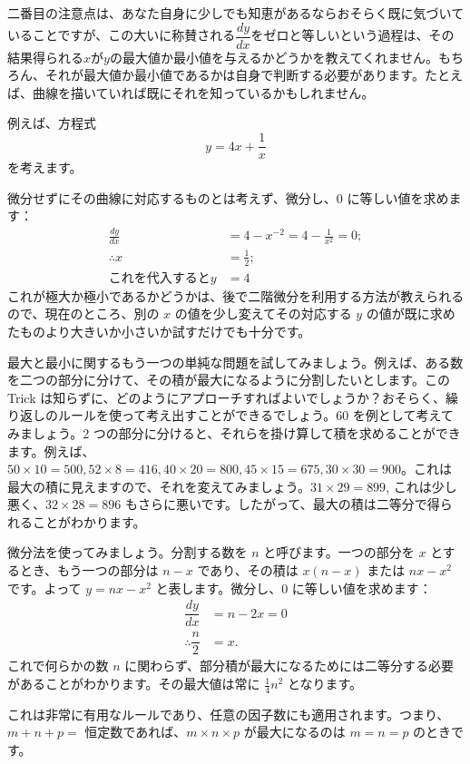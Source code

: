 \documentclass[a4paper,11pt,openany]{ltjsbook}
\begin{document}
二番目の注意点は、あなた自身に少しでも知恵があるならおそらく既に気づいていることですが、この大いに称賛される$\dfrac{dy}{dx}$をゼロと等しいという過程は、その結果得られる$x$が$y$の最大値か最小値を与えるかどうかを教えてくれません。もちろん、それが最大値か最小値であるかは自身で判断する必要があります。たとえば、曲線を描いていれば既にそれを知っているかもしれません。

例えば、方程式
\[
y = 4x + \frac{1}{x}
\]
を考えます。

微分せずにその曲線に対応するものとは考えず、微分し、0 に等しい値を求めます：
\begin{align*}
\frac{dy}{dx} &= 4 - x^{-2} = 4 - \frac{1}{x^2} = 0; \\
\therefore x &= \frac{1}{2}; \\
\text{これを代入すると} y &= 4
\end{align*}
これが極大か極小であるかどうかは、後で二階微分を利用する方法が教えられるので、現在のところ、別の $x$ の値を少し変えてその対応する $y$ の値が既に求めたものより大きいか小さいか試すだけでも十分です。

最大と最小に関するもう一つの単純な問題を試してみましょう。例えば、ある数を二つの部分に分けて、その積が最大になるように分割したいとします。この Trick は知らずに、どのようにアプローチすればよいでしょうか？おそらく、繰り返しのルールを使って考え出すことができるでしょう。60 を例として考えてみましょう。2 つの部分に分けると、それらを掛け算して積を求めることができます。例えば、$50 \times 10 = 500, 52 \times 8 = 416, 40 \times 20 = 800, 45 \times 15 = 675, 30 \times 30 = 900$。これは最大の積に見えますので、それを変えてみましょう。$31 \times 29 = 899$, これは少し悪く、$32 \times 28 = 896$ もさらに悪いです。したがって、最大の積は二等分で得られることがわかります。

微分法を使ってみましょう。分割する数を $n$ と呼びます。一つの部分を $x$ とするとき、もう一つの部分は $n-x$ であり、その積は $x(n-x)$ または $nx - x^2$ です。よって $y = nx - x^2$ と表します。微分し、0 に等しい値を求めます：
\begin{align*}
\dfrac{dy}{dx} &= n - 2x = 0 \\
\therefore \dfrac{n}{2} &= x.
\end{align*}
これで何らかの数 $n$ に関わらず、部分積が最大になるためには二等分する必要があることがわかります。その最大値は常に $\frac{1}{4} n^2$ となります。

これは非常に有用なルールであり、任意の因子数にも適用されます。つまり、$m + n + p = $ 恒定数であれば、$m \times n \times p$ が最大になるのは $m = n = p$ のときです。
\end{document}
